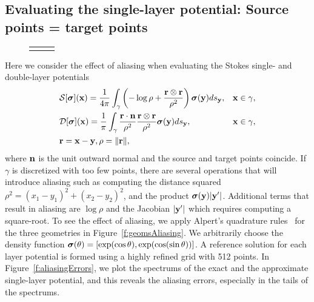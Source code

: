 \subsection{Evaluating the single-layer potential: Source points =
target points}
\begin{figure}[htpb]
  \centering
  \begin{tabular}{ccc}
   &
   & 
  
  \end{tabular}
\end{figure}

Here we consider the effect of aliasing when evaluating the Stokes
single- and double-layer potentials
\begin{align*}
  &{\mathcal{S}}[{\boldsymbol\sigma}]({\mathbf{x}}) = \frac{1}{4\pi}\int_{\gamma} \left(-\log \rho +
  \frac{{\mathbf{r}} \otimes {\mathbf{r}}}{\rho^{2}}\right){\boldsymbol\sigma}({\mathbf{y}}) ds_{{\mathbf{y}}},
  &&{\mathbf{x}} \in \gamma, \\
  &{\mathcal{D}}[{\boldsymbol\sigma}]({\mathbf{x}}) = \frac{1}{\pi}\int_{\gamma}
  \frac{{\mathbf{r}} \cdot {\mathbf{n}}}{\rho^{2}}
  \frac{{\mathbf{r}} \otimes {\mathbf{r}}}{\rho^{2}}{\boldsymbol\sigma}({\mathbf{y}}) ds_{{\mathbf{y}}},
  &&{\mathbf{x}} \in \gamma, \\
  &{\mathbf{r}} = {\mathbf{x}} - {\mathbf{y}}, \rho = \|{\mathbf{r}}\|,
\end{align*}
where ${\mathbf{n}}$ is the unit outward normal and the source and target points
coincide.  If $\gamma$ is discretized with too few points, there are
several operations that will introduce aliasing such as computing the
distance squared $\rho^{2} = (x_{1} - y_{1})^{2} + (x_{2}-y_{2})^2$, and
the product ${\boldsymbol\sigma}({\mathbf{y}}) |{\mathbf{y}}'|$.  Additional terms that result in
aliasing are $\log \rho$ and the Jacobian $|{\mathbf{y}}'|$ which requires
computing a square-root.  To see the effect of aliasing, we apply
Alpert's quadrature rules~\cite{alp1999} for the three geometries in
Figure~\ref{f:geomsAliasing}.  We arbitrarily choose the density
function ${\boldsymbol\sigma}(\theta) = [\exp(\cos \theta),\exp(\cos(\sin
\theta))]$.  A reference solution for each layer potential is formed
using a highly refined grid with 512 points.  In
Figure~\ref{f:aliasingErrors}, we plot the spectrums of the exact and the
approximate single-layer potential, and this reveals the aliasing
errors, especially in the tails of the spectrums.

